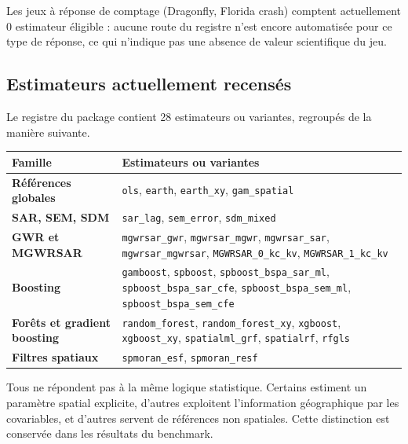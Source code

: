 \documentclass[11pt,a4paper]{article}
\begin{document}
Les jeux à réponse de comptage (Dragonfly, Florida crash) comptent actuellement 0 estimateur éligible : aucune route du registre n'est encore automatisée pour ce type de réponse, ce qui n'indique pas une absence de valeur scientifique du jeu.

\subsection{Estimateurs actuellement recensés}

Le registre du package contient 28 estimateurs ou variantes, regroupés de la manière suivante.

\begin{center}
\scriptsize
\begin{tabularx}{\textwidth}{>{\bfseries}p{3.2cm}X}
\toprule
Famille & Estimateurs ou variantes \\
\midrule
Références globales & \texttt{ols}, \texttt{earth}, \texttt{earth\_xy}, \texttt{gam\_spatial} \\
SAR, SEM, SDM & \texttt{sar\_lag}, \texttt{sem\_error}, \texttt{sdm\_mixed} \\
GWR et MGWRSAR & \texttt{mgwrsar\_gwr}, \texttt{mgwrsar\_mgwr}, \texttt{mgwrsar\_sar}, \texttt{mgwrsar\_mgwrsar}, \texttt{MGWRSAR\_0\_kc\_kv}, \texttt{MGWRSAR\_1\_kc\_kv} \\
Boosting & \texttt{gamboost}, \texttt{spboost}, \texttt{spboost\_bspa\_sar\_ml}, \texttt{spboost\_bspa\_sar\_cfe}, \texttt{spboost\_bspa\_sem\_ml}, \texttt{spboost\_bspa\_sem\_cfe} \\
Forêts et gradient boosting & \texttt{random\_forest}, \texttt{random\_forest\_xy}, \texttt{xgboost}, \texttt{xgboost\_xy}, \texttt{spatialml\_grf}, \texttt{spatialrf}, \texttt{rfgls} \\
Filtres spatiaux & \texttt{spmoran\_esf}, \texttt{spmoran\_resf} \\
\bottomrule
\end{tabularx}
\end{center}

Tous ne répondent pas à la même logique statistique. Certains estiment un paramètre spatial explicite, d'autres exploitent l'information géographique par les covariables, et d'autres servent de références non spatiales. Cette distinction est conservée dans les résultats du benchmark.
\end{document}
